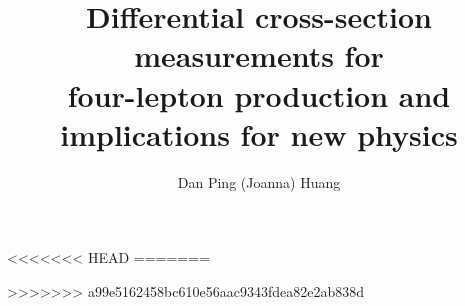 \documentclass[hyperpdf,bindnopdf]{hepthesis}
\title{\Large Differential cross-section measurements
for \\ 
four-lepton production and implications for new physics}
\author{\large Dan Ping (Joanna) Huang}
\begin{document}
\begin{frontmatter}
  
%   
\end{frontmatter}

\begin{mainmatter}
%   
%   
%   
<<<<<<< HEAD
%   
=======
  
>>>>>>> a99e5162458bc610e56aac9343fdea82e2ab838d
%   
%   
\end{mainmatter}

\begin{appendices}
%     
\end{appendices}

\begin{backmatter}
   
\end{backmatter}

\end{document}
